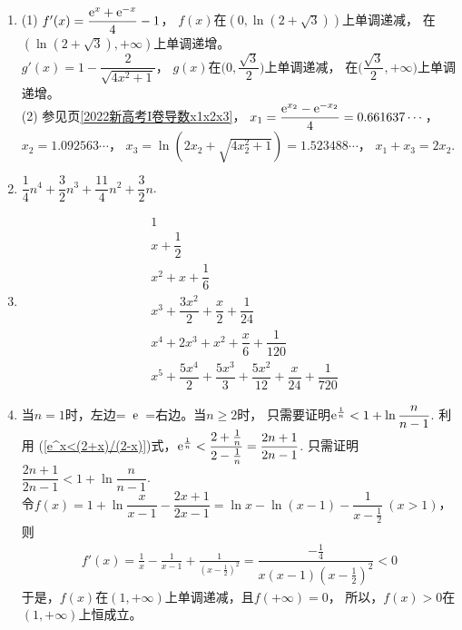 \begin{enumerate}[label={\textbf{\arabic*.}},leftmargin=
    \inteval{\myenumleftmargin}pt]
\item (1) $ f'(x)=\dfrac{\mathrm{e}^x+\mathrm{e}^{-x}}{4}-1 $，
$ f(x) $在$ (0,\ln(2+\sqrt{3})) $上单调递减，
在$ (\ln(2+\sqrt{3}),+\infty) $上单调递增。\\
$ g'(x)=1-\dfrac{2}{\sqrt{4x^2+1}} $，
$ g(x) $在$ \Big(0,\dfrac{\sqrt{3}}{2}\Big) $上单调递减，
在$ \Big(\dfrac{\sqrt{3}}{2},+\infty\Big) $上单调递增。\\
(2) 参见\pageref{2022新高考I卷导数x1x2x3}页\ref{2022新高考I卷导数x1x2x3}，
$ x_1=\dfrac{\mathrm{e}^{x_2}-\mathrm{e}^{-x_2}}{4}=0.661637\cdots $，\\
$ x_2=1.092563\cdots $，
$ x_3=\ln(2x_2+\sqrt{4x_2^2+1})=1.523488\cdots $，
$ x_1+x_3=2x_2 $.

\item 
$ \dfrac{1}{4}n^4+\dfrac{3}{2}n^3+\dfrac{11}{4}n^2+\dfrac{3}{2}n $.

\item 
\begin{align*}
    & 1                                             \\
    & x+\dfrac{1}{2}                                \\
    & x^2+x+\dfrac{1}{6}                            \\
    & x^3+\dfrac{3x^2}{2}+\dfrac{x}{2}+\dfrac{1}{24}\\
    & x^4+2x^3+x^2+\dfrac{x}{6}+\dfrac{1}{120}		\\	
    & x^5+\dfrac{5x^4}{2}+\dfrac{5x^3}{3}+\dfrac{5x^2}{12}+
    \dfrac{x}{24}+\dfrac{1}{720}
\end{align*} 

\item  当$ n=1 $时，左边=\ $ \mathrm{e} $\ =右边。当$ n\geq 2 $时，
只需要证明$ \mathrm{e}^{\frac{1}{n}}<1+\ln \dfrac{n}{n-1} $. 利用
(\ref{e^x<(2+x)/(2-x)})式，$ \mathrm{e}^{\frac{1}{n}}<\dfrac{2+
    \frac{1}{n}}{2-\frac{1}{n}}=\dfrac{2n+1}{2n-1} $.
只需证明$ \dfrac{2n+1}{2n-1}<1+\ln \dfrac{n}{n-1} $. \\
令$ f(x)=1+\ln \dfrac{x}{x-1}-\dfrac{2x+1}{2x-1}=
\ln x-\ln(x-1)-\dfrac{1}{x-\frac{1}{2}}\ (x>1) $，则
\begin{align*}
    f'(x)=\frac{1}{x}-\frac{1}{x-1}+\frac{1}{(x-\frac{1}{2})^2}
    =\dfrac{-\frac{1}{4}}{x(x-1)(x-\frac{1}{2})^2}<0
\end{align*}
于是，$ f(x) $在$ (1,+\infty) $上单调递减，且$ f(+\infty)=0 $，
所以，$ f(x)>0 $在$ (1,+\infty) $上恒成立。


\end{enumerate}
